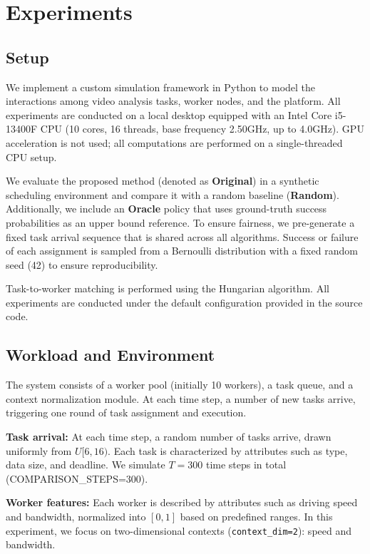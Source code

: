 \section{Experiments}
\label{sec:experiments}

\subsection{Setup}
We implement a custom simulation framework in Python to model the interactions among video analysis tasks, worker nodes, and the platform. All experiments are conducted on a local desktop equipped with an Intel Core i5-13400F CPU (10 cores, 16 threads, base frequency 2.50GHz, up to 4.0GHz). GPU acceleration is not used; all computations are performed on a single-threaded CPU setup.

We evaluate the proposed method (denoted as \textbf{Original}) in a synthetic scheduling environment and compare it with a random baseline (\textbf{Random}). Additionally, we include an \textbf{Oracle} policy that uses ground-truth success probabilities as an upper bound reference. To ensure fairness, we pre-generate a fixed task arrival sequence that is shared across all algorithms. Success or failure of each assignment is sampled from a Bernoulli distribution with a fixed random seed (42) to ensure reproducibility.

Task-to-worker matching is performed using the Hungarian algorithm. All experiments are conducted under the default configuration provided in the source code.

\subsection{Workload and Environment}
The system consists of a worker pool (initially 10 workers), a task queue, and a context normalization module. At each time step, a number of new tasks arrive, triggering one round of task assignment and execution.

\textbf{Task arrival:} At each time step, a random number of tasks arrive, drawn uniformly from $U[6,16)$. Each task is characterized by attributes such as type, data size, and deadline. We simulate $T=300$ time steps in total (COMPARISON\_STEPS=300).

\textbf{Worker features:} Each worker is described by attributes such as driving speed and bandwidth, normalized into $[0,1]$ based on predefined ranges. In this experiment, we focus on two-dimensional contexts (\texttt{context\_dim=2}): speed and bandwidth.

